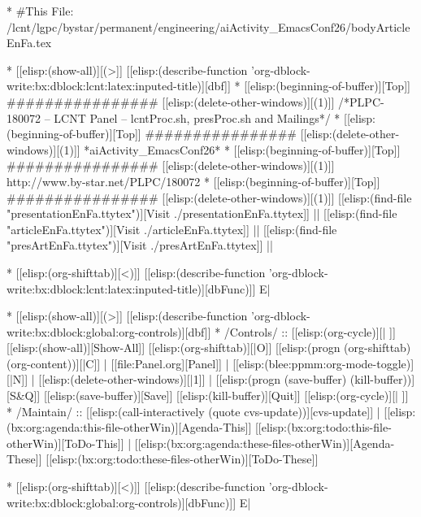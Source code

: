 
\begin{whenOrg}
*  #This File: /lcnt/lgpc/bystar/permanent/engineering/aiActivity_EmacsConf26/bodyArticleEnFa.tex

\end{whenOrg}

\begin{whenOrg}
* [[elisp:(show-all)][(>]] [[elisp:(describe-function 'org-dblock-write:bx:dblock:lcnt:latex:inputed-title)][dbf]]
*  [[elisp:(beginning-of-buffer)][Top]] ################  [[elisp:(delete-other-windows)][(1)]]   /*PLPC-180072 -- LCNT Panel -- lcntProc.sh, presProc.sh and Mailings*/
*  [[elisp:(beginning-of-buffer)][Top]] ################  [[elisp:(delete-other-windows)][(1)]]   *aiActivity_EmacsConf26*
*  [[elisp:(beginning-of-buffer)][Top]] ################  [[elisp:(delete-other-windows)][(1)]]   http://www.by-star.net/PLPC/180072
*  [[elisp:(beginning-of-buffer)][Top]] ################  [[elisp:(delete-other-windows)][(1)]]   [[elisp:(find-file "presentationEnFa.ttytex")][Visit ./presentationEnFa.ttytex]] || [[elisp:(find-file "articleEnFa.ttytex")][Visit ./articleEnFa.ttytex]] || [[elisp:(find-file "presArtEnFa.ttytex")][Visit ./presArtEnFa.ttytex]] ||

* [[elisp:(org-shifttab)][<)]] [[elisp:(describe-function 'org-dblock-write:bx:dblock:lcnt:latex:inputed-title)][dbFunc)]]  E|

\end{whenOrg}

\begin{whenOrg}
* [[elisp:(show-all)][(>]] [[elisp:(describe-function 'org-dblock-write:bx:dblock:global:org-controls)][dbf]]
*  /Controls/ ::  [[elisp:(org-cycle)][| ]]  [[elisp:(show-all)][Show-All]]  [[elisp:(org-shifttab)][|O]]  [[elisp:(progn (org-shifttab) (org-content))][|C]] | [[file:Panel.org][Panel]] | [[elisp:(blee:ppmm:org-mode-toggle)][|N]] | [[elisp:(delete-other-windows)][|1]] | [[elisp:(progn (save-buffer) (kill-buffer))][S&Q]]  [[elisp:(save-buffer)][Save]]  [[elisp:(kill-buffer)][Quit]] [[elisp:(org-cycle)][| ]]
*  /Maintain/ ::  [[elisp:(call-interactively (quote cvs-update))][cvs-update]] | [[elisp:(bx:org:agenda:this-file-otherWin)][Agenda-This]] [[elisp:(bx:org:todo:this-file-otherWin)][ToDo-This]] | [[elisp:(bx:org:agenda:these-files-otherWin)][Agenda-These]] [[elisp:(bx:org:todo:these-files-otherWin)][ToDo-These]]

* [[elisp:(org-shifttab)][<)]] [[elisp:(describe-function 'org-dblock-write:bx:dblock:global:org-controls)][dbFunc)]]  E|

\end{whenOrg}

